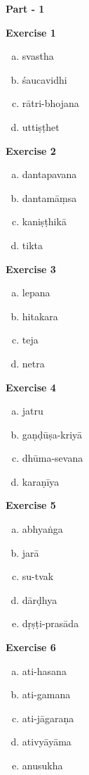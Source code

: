 \begin{center}
\textbf{\LARGE Part - 1}
\end{center}

\begin{multicols}{2}
\textbf{Exercise 1}
\begin{enumerate}[a.]
\item svastha
\item śaucavidhi
\item rātri-bhojana 
\item uttiṣṭhet
\end{enumerate}
\vspace{.3cm}

\textbf{Exercise 2}
\begin{enumerate}[a.]
\item dantapavana
\item dantamāṃsa
\item kaniṣṭhikā
\item tikta
\end{enumerate}
\vspace{.3cm}

\textbf{Exercise 3}
\begin{enumerate}[a.]
\item lepana 
\item hitakara
\item teja
\item netra
\end{enumerate}
\vspace{.3cm}

\textbf{Exercise 4}
\begin{enumerate}[a.]
\item jatru
\item gaṇḍūṣa-kriyā
\item dhūma-sevana
\item karaṇīya
\end{enumerate}

\textbf{Exercise 5}
\begin{enumerate}[a.]
\item abhyaṅga
\item jarā
\item su-tvak
\item dārḍhya
\item dṛṣṭi-prasāda
\end{enumerate}

\textbf{Exercise 6}
\begin{enumerate}[a.]
\item ati-hasana
\item ati-gamana
\item ati-jāgaraṇa
\item ativyāyāma
\item anusukha
\end{enumerate}


\end{multicols}
